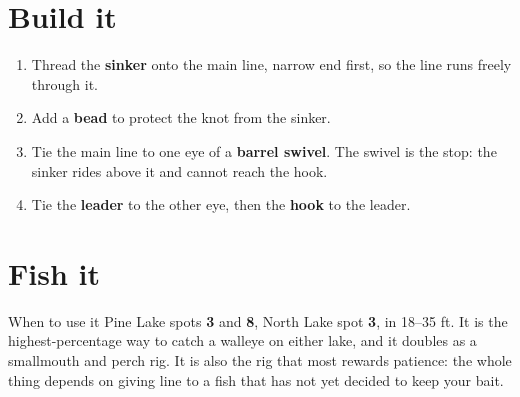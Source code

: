 \section{Build it}
\begin{enumerate}
\item Thread the \textbf{sinker} onto the main line, narrow end first, so the line runs freely through it.
\item Add a \textbf{bead} to protect the knot from the sinker.
\item Tie the main line to one eye of a \textbf{barrel swivel}. The swivel is the stop: the sinker rides above it and cannot reach the hook.
\item Tie the \textbf{leader} to the other eye, then the \textbf{hook} to the leader.
\end{enumerate}

\section{Fish it}
\begin{telosfacts}[0.20]
\end{telosfacts}

\begin{telospanel}{When to use it}
Pine Lake spots \textbf{3} and \textbf{8}, North Lake spot \textbf{3}, in 18--35 ft. It is the highest-percentage way to catch a walleye on either lake, and it doubles as a smallmouth and perch rig. It is also the rig that most rewards patience: the whole thing depends on giving line to a fish that has not yet decided to keep your bait.
\end{telospanel}

